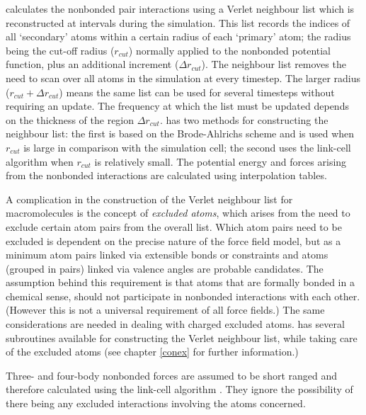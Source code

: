 \D{} calculates the nonbonded pair interactions using a
Verlet neighbour list \cite{allen-89a} which is reconstructed at
intervals during the simulation. This list records the indices of all
`secondary' atoms within a certain radius of each `primary' atom; the
radius being the cut-off radius ($r_{cut}$) normally applied to the
nonbonded potential function, plus an additional increment ($\Delta
r_{cut}$). The neighbour list removes the need to scan over all atoms
in the simulation at every timestep.  The larger radius
($r_{cut}+\Delta r_{cut}$) means the same list can be used for several
timesteps without requiring an update. The frequency at which the list
must be updated depends on the thickness of the region $\Delta
r_{cut}$. \D{} has two methods for constructing the neighbour
list: the first is based on the Brode-Ahlrichs scheme
\cite{brode-86a} and is used when $r_{cut}$ is large in comparison with
the simulation cell; the second uses the link-cell algorithm
\cite{hockney-81a} when $r_{cut}$ is relatively small. The potential
energy and forces arising from the nonbonded interactions are
calculated using interpolation tables.

A complication in the construction of the Verlet
neighbour list for macromolecules is the concept of {\em excluded atoms},
which arises from the need to exclude certain atom pairs from the overall
list.  Which atom pairs need to be excluded is dependent on the precise nature
of the force field model, but as a minimum atom pairs
linked via extensible bonds or
constraints and atoms (grouped in pairs) linked via
valence angles are probable candidates. The
assumption behind this requirement is that atoms that are formally
bonded in a chemical sense, should not participate in
nonbonded interactions with each other.  (However
this is not a universal requirement of all force fields.)
The same considerations are needed in dealing with charged excluded atoms. \D{}
has several subroutines available for constructing the
Verlet neighbour list, while taking care of the
excluded atoms (see chapter \ref{conex} for further information.)

Three- and
four-body
nonbonded forces are assumed to be short
ranged and therefore calculated using the link-cell algorithm
\cite{hockney-81a}. They ignore the possibility of there being any
excluded interactions involving the atoms concerned. 

